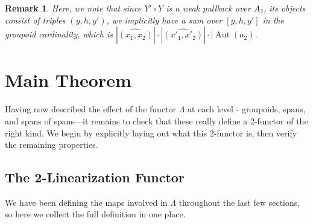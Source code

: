 \documentclass[10pt]{amsart}
\numberwithin{theorem}{subsection}
\newtheorem{varremark}[theorem]{Remark}
\newenvironment{remark}{\begin{varremark}\em}{\em\end{varremark}}
\newcommand{\opname}[1]{\operatorname{#1}}
\newcommand{\FV}{\Lambda}
\begin{document}
\begin{remark}
Here, we note that since $Y' \circ Y$ is a weak pullback over $A_2$,
its objects consist of triples $(y,h,y')$, we implicitly have a sum
over $[y,h,y']$ in the groupoid cardinality, which is
$|\widehat{(x_1,x_2)}| \cdot |\widehat{(x'_1,x'_2)}| \cdot
|\opname{Aut}(a_2)$.
\end{remark}

\section{Main Theorem}\label{sec:maintheorem}

Having now described the effect of the functor $\FV$ at each level -
groupoids, spans, and spans of spans---it remains to check that these
really define a 2-functor of the right kind.  We begin by explicitly
laying out what this 2-functor is, then verify the remaining
properties.

\subsection{The 2-Linearization Functor}

We have been defining the maps involved in $\FV$ throughout the last
few sections, so here we collect the full definition in one place.
\end{document}
